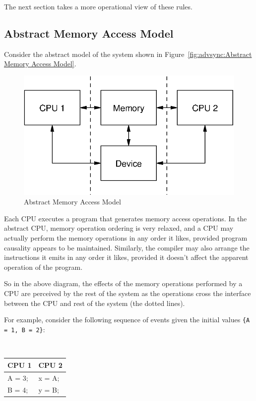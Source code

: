 The next section takes a more operational view of these rules.

\subsection{Abstract Memory Access Model}

Consider the abstract model of the system shown in
Figure~\ref{fig:advsync:Abstract Memory Access Model}.

\begin{figure}[htb]
\centering
\includegraphics{advsync/AbstractMemoryAccessModel}
\caption{Abstract Memory Access Model}
\end{figure}

Each CPU executes a program that generates memory access operations.  In the
abstract CPU, memory operation ordering is very relaxed, and a CPU may actually
perform the memory operations in any order it likes, provided program causality
appears to be maintained.  Similarly, the compiler may also arrange the
instructions it emits in any order it likes, provided it doesn't affect the
apparent operation of the program.

So in the above diagram, the effects of the memory operations performed by a
CPU are perceived by the rest of the system as the operations cross the
interface between the CPU and rest of the system (the dotted lines).


For example, consider the following sequence of events given the
initial values {\tt \{A = 1, B = 2\}}:

\vspace{5pt}
\begin{minipage}[t]{\columnwidth}
\tt
\scriptsize
\begin{tabular}{l|l}
	CPU 1 &		CPU 2 \\
	\hline
	A = 3; &	x = A; \\
	B = 4; &	y = B; \\
\end{tabular}
\end{minipage}
\vspace{5pt}

